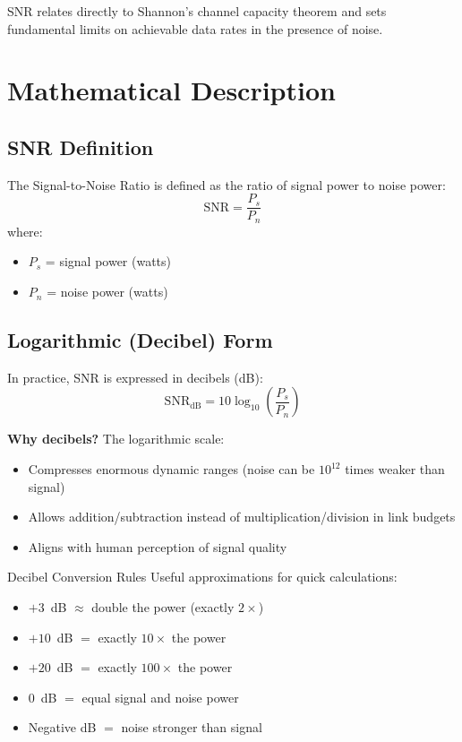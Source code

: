SNR relates directly to Shannon's channel capacity theorem and sets fundamental limits on achievable data rates in the presence of noise.

\section{Mathematical Description}

\subsection{SNR Definition}

The Signal-to-Noise Ratio is defined as the ratio of signal power to noise power:
\begin{equation}
\mathrm{SNR} = \frac{P_s}{P_n}
\end{equation}
where:
\begin{itemize}
\item $P_s$ = signal power (watts)
\item $P_n$ = noise power (watts)
\end{itemize}

\subsection{Logarithmic (Decibel) Form}

In practice, SNR is expressed in decibels (dB):
\begin{equation}
\mathrm{SNR_{dB}} = 10\log_{10}\left(\frac{P_s}{P_n}\right)
\end{equation}

\textbf{Why decibels?} The logarithmic scale:
\begin{itemize}
\item Compresses enormous dynamic ranges (noise can be $10^{12}$ times weaker than signal)
\item Allows addition/subtraction instead of multiplication/division in link budgets
\item Aligns with human perception of signal quality
\end{itemize}

\begin{calloutbox}{Decibel Conversion Rules}
Useful approximations for quick calculations:
\begin{itemize}
\item $+3$~dB $\approx$ double the power (exactly $2\times$)
\item $+10$~dB $=$ exactly $10\times$ the power
\item $+20$~dB $=$ exactly $100\times$ the power
\item $0$~dB $=$ equal signal and noise power
\item Negative dB $=$ noise stronger than signal
\end{itemize}
\end{calloutbox}

